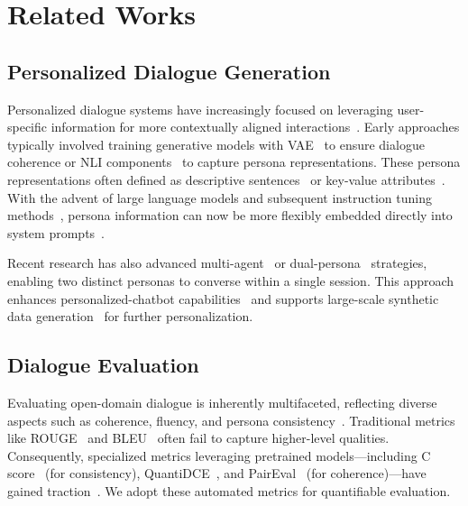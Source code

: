 \section{Related Works}
\label{sec:related}

\subsection{Personalized Dialogue Generation}
\label{sec:related.1} 
Personalized dialogue systems have increasingly focused on leveraging user-specific information for more contextually aligned interactions~\cite{li2016persona, zhang2018personalizing, zhang2019dialogpt, roller2020recipes}. Early approaches typically involved training generative models with VAE~\cite{lee2022improving} to ensure dialogue coherence or NLI components~\cite{song2021bob, chen2023learning, zhou2023simoap} to capture persona representations. These persona representations often defined as descriptive sentences~\cite{zhang2018personalizing, dinan2020second} or key-value attributes~\cite{qian2017assigning, gao2023livechat}. With the advent of large language models and subsequent instruction tuning methods~\cite{ouyang2022training}, persona information can now be more flexibly embedded directly into system prompts~\cite{yang2023palr, wang2023rolellm}.

Recent research has also advanced multi-agent~\cite{park2023generative} or dual-persona~\cite{xu2022cosplay, jandaghi2023faithful} strategies, enabling two distinct personas to converse within a single session. This approach enhances personalized-chatbot capabilities~\cite{shuster2022blenderbot, lee2023p5} and supports large-scale synthetic data generation~\cite{jandaghi2023faithful} for further personalization. 

\subsection{Dialogue Evaluation}
\label{sec:related.2} 
Evaluating open-domain dialogue is inherently multifaceted, reflecting diverse aspects such as coherence, fluency, and persona consistency~\cite{wang2024learning, samuel2024personagym}. Traditional metrics like ROUGE~\cite{lin2004rouge} and BLEU~\cite{papineni2002bleu} often fail to capture higher-level qualities. Consequently, specialized metrics leveraging pretrained models—including C score~\cite{madotto2019personalizing} (for consistency), QuantiDCE~\cite{ye2021towards}, and PairEval~\cite{park2024paireval} (for coherence)—have gained traction~\cite{ghazarian2022deam, li2024dialogues}. We adopt these automated metrics for quantifiable evaluation.

